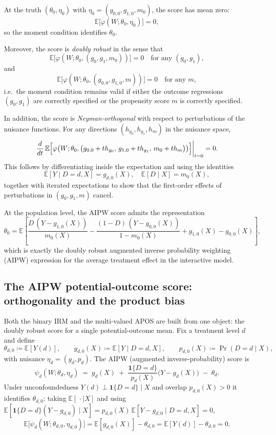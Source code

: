 \documentclass [11pt]{article}
\theoremstyle{plain}
\theoremstyle{definition}
\theoremstyle{remark}
\newcommand{\1}{\bm{1}}
\newcommand{\E}{\mathbb{E}}
\begin{document}
\begin{appendices}
At the truth \((\theta_0,\eta_0)\) with \(\eta_0 = (g_{0,0},g_{1,0},m_0)\), the score has mean zero:
\[
\E\bigl[\varphi(W; \theta_0, \eta_0)\bigr] = 0,
\]
so the moment condition identifies \(\theta_0\).

Moreover, the score is \emph{doubly robust} in the sense that
\[
\E\bigl[\varphi(W; \theta_0, (g_0,g_1,m_0))\bigr] = 0 \quad\text{for any } (g_0,g_1),
\]
and
\[
\E\bigl[\varphi(W; \theta_0, (g_{0,0},g_{1,0},m))\bigr] = 0 \quad\text{for any } m,
\]
i.e.\ the moment condition remains valid if either the outcome regressions \((g_0,g_1)\) are correctly specified or the propensity score \(m\) is correctly specified.

In addition, the score is \emph{Neyman-orthogonal} with respect to perturbations of the nuisance functions.
For any directions \((h_{g_0},h_{g_1},h_m)\) in the nuisance space,
\[
\left. \frac{d}{dt}\, \E\Bigl[ \varphi\bigl( W;\theta_0,\bigl(g_{0,0} + t h_{g_0},\, g_{1,0} + t h_{g_1},\, m_0 + t h_m\bigr) \bigr) \Bigr] \right|_{t=0} = 0.
\]
This follows by differentiating inside the expectation and using the identities
\[
\E[Y \mid D=d,X] = g_{d,0}(X),\quad \E[D \mid X] = m_0(X),
\]
together with iterated expectations to show that the first-order effects of perturbations in \((g_0,g_1,m)\) cancel.

At the population level, the AIPW score admits the representation
\[
\theta_0 = \E\left[ \frac{D\,(Y - g_{1,0}(X))}{m_0(X)} - \frac{(1-D)\,(Y - g_{0,0}(X))}{1 - m_0(X)} + g_{1,0}(X) - g_{0,0}(X) \right],
\]
which is exactly the doubly robust augmented inverse probability weighting (AIPW) expression for the average treatment effect in the interactive model.



\subsection{The AIPW potential-outcome score: orthogonality and the product bias}\label{sec:theory_aipw_bias}

Both the binary IRM and the multi-valued APOS are built from one object: the doubly robust score for a single potential-outcome mean. Fix a treatment level \(d\) and define
\[
\theta_{d,0} \coloneqq \E[Y(d)], \qquad
g_{d,0}(X) \coloneqq \E[Y\mid D=d,X], \qquad
p_{d,0}(X) \coloneqq \Pr(D=d\mid X),
\]
with nuisance \(\eta_d=(g_d,p_d)\). The AIPW (augmented inverse-probability) score is
\[
\psi_d(W;\theta_d,\eta_d) \;=\; g_d(X) \;+\; \frac{\mathbf 1\{D=d\}}{p_d(X)}\bigl(Y-g_d(X)\bigr) \;-\; \theta_d .
\]
Under unconfoundedness \(Y(d)\perp \mathbf 1\{D=d\}\mid X\) and overlap \(p_{d,0}(X)>0\) it identifies \(\theta_{d,0}\): taking \(\E[\,\cdot\mid X]\) and using \(\E[\mathbf 1\{D=d\}(Y-g_{d,0})\mid X]=p_{d,0}(X)\,\E[Y-g_{d,0}\mid D=d,X]=0\),
\[
\E\bigl[\psi_d(W;\theta_{d,0},\eta_{d,0})\bigr]=\E[g_{d,0}(X)]-\theta_{d,0}=\E[Y(d)]-\theta_{d,0}=0 .
\]


\end{appendices}
\end{document}
